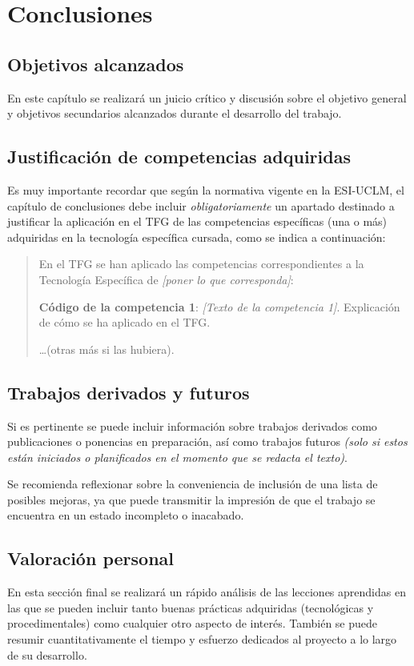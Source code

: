 \chapter{Conclusiones}
\label{cap:Conclusiones}

\section{Objetivos alcanzados}
En este capítulo se realizará un juicio crítico y discusión sobre el objetivo general y objetivos secundarios alcanzados durante el desarrollo del trabajo. 

\section{Justificación de competencias adquiridas}
Es muy importante recordar que según la normativa vigente en la ESI-UCLM, el capítulo de conclusiones debe incluir \emph{obligatoriamente} un apartado destinado a justificar la aplicación en el TFG de las competencias específicas (una o más) adquiridas en la tecnología específica cursada, como se indica a continuación:

\begin{quote}
	En el TFG se han aplicado las competencias correspondientes a la Tecnología Específica de \emph{[poner lo que corresponda]}:

	\textbf{Código de la competencia 1}: \emph{[Texto de la competencia 1]}. Explicación de cómo se ha aplicado en el TFG.
	
	\dots (otras más si las hubiera).
\end{quote}

\section{Trabajos derivados y futuros}
Si es pertinente se puede incluir información sobre trabajos derivados como publicaciones o ponencias en preparación, así como trabajos futuros \emph{(solo si estos están iniciados o planificados en el momento que se redacta el texto)}.

Se recomienda reflexionar sobre la conveniencia de inclusión de una lista de posibles mejoras, ya que puede transmitir la impresión de que el trabajo se encuentra en un estado incompleto o inacabado.

\section{Valoración personal}
En esta sección final se realizará un rápido análisis de las lecciones aprendidas en las que se pueden incluir tanto buenas prácticas adquiridas (tecnológicas y procedimentales) como cualquier otro aspecto de interés. También se puede resumir cuantitativamente el tiempo y esfuerzo dedicados al proyecto a lo largo de su desarrollo.







